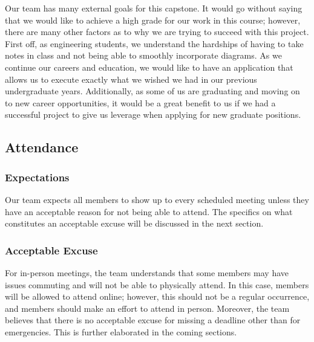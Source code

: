 \documentclass{article}
\begin{document}

Our team has many external goals for this capstone. It would go without saying 
that we would like to achieve a high grade for our work in this course; 
however, there are many other factors as to why we are trying to succeed with 
this project. First off, as engineering students, we understand the hardships 
of having to take notes in class and not being able to smoothly incorporate 
diagrams. As we continue our careers and education, we would like to have an 
application that allows us to execute exactly what we wished we had in our 
previous undergraduate years.
Additionally, as some of us are graduating and moving on to new career 
opportunities, it would be a great benefit to us if we had a successful
 project to give us leverage when applying for new graduate positions. 


\subsection*{Attendance}

\subsubsection*{Expectations}


Our team expects all members to show up to every scheduled meeting unless they
 have an acceptable reason for not being able to attend. The specifics on what 
 constitutes an acceptable excuse will be discussed in the next section.

\subsubsection*{Acceptable Excuse}


For in-person meetings, the team understands that some members may have issues
 commuting and will not be able to physically attend. In this case, members 
 will be allowed to attend online; however, this should not be a regular 
 occurrence, and members should make an effort to attend in person. 
 Moreover, the team believes that there is no acceptable excuse for missing
 a deadline other than for emergencies. 
 This is further elaborated in the coming sections. 
\end{document}
